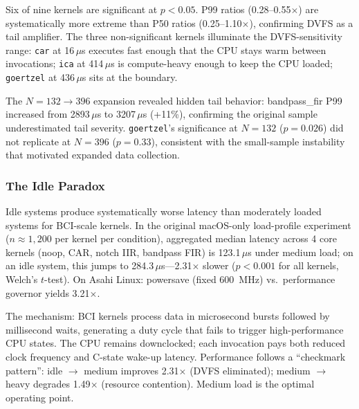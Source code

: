 \documentclass[sigplan,10pt]{acmart}
\begin{document}
Six of nine kernels are significant at $p < 0.05$. P99 ratios (0.28--0.55$\times$) are systematically more extreme than P50 ratios (0.25--1.10$\times$), confirming DVFS as a tail amplifier. The three non-significant kernels illuminate the DVFS-sensitivity range: \texttt{car} at 16\,$\mu$s executes fast enough that the CPU stays warm between invocations; \texttt{ica} at 414\,$\mu$s is compute-heavy enough to keep the CPU loaded; \texttt{goertzel} at 436\,$\mu$s sits at the boundary.

The $N=132 \to 396$ expansion revealed hidden tail behavior: bandpass\_fir P99 increased from 2893\,$\mu$s to 3207\,$\mu$s (+11\%), confirming the original sample underestimated tail severity. \texttt{goertzel}'s significance at $N=132$ ($p=0.026$) did not replicate at $N=396$ ($p=0.33$), consistent with the small-sample instability that motivated expanded data collection.

\subsubsection{The Idle Paradox}
\label{sec:idle-paradox}

Idle systems produce systematically worse latency than moderately loaded systems for BCI-scale kernels. In the original macOS-only load-profile experiment ($n \approx 1{,}200$ per kernel per condition), aggregated median latency across 4 core kernels (noop, CAR, notch IIR, bandpass FIR) is 123.1\,$\mu$s under medium load; on an idle system, this jumps to 284.3\,$\mu$s---2.31$\times$ slower ($p < 0.001$ for all kernels, Welch's $t$-test). On Asahi Linux: powersave (fixed 600~MHz) vs.\ performance governor yields 3.21$\times$.


The mechanism: BCI kernels process data in microsecond bursts followed by millisecond waits, generating a duty cycle that fails to trigger high-performance CPU states. The CPU remains downclocked; each invocation pays both reduced clock frequency and C-state wake-up latency. Performance follows a ``checkmark pattern'': idle $\to$ medium improves 2.31$\times$ (DVFS eliminated); medium $\to$ heavy degrades 1.49$\times$ (resource contention). Medium load is the optimal operating point.
\end{document}
